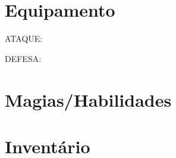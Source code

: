 \documentclass[10pt,twoside,twocolumn]{book}
\begin{document}
\section*{Equipamento}
\begin{rpg-quotebox}{}
     \begin{rpg-list}
       \item ATAQUE:
       \item DEFESA:
  	\end{rpg-list}
\end{rpg-quotebox}

\newpage

\section*{Magias/Habilidades}
\begin{rpg-quotebox}{}
	\begin{rpg-list}
       \item  
       \item 
       \item 
       \item  
       \item 
       \item
       \item
       \item
       \item
       \item
       \item
  	\end{rpg-list}
\end{rpg-quotebox}

\section*{Inventário}
\begin{rpg-quotebox}{}
	\begin{rpg-list}
       \item  
       \item 
       \item 
       \item  
       \item 
       \item
       \item
       \item
       \item
       \item
       \item
       \item
       \item
  	\end{rpg-list}
\end{rpg-quotebox}

\clearpage
\end{document}
